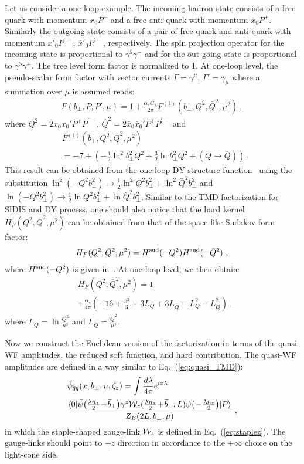 \documentclass[aps,rmp,reprint,amsmath,amssymb,graphicx,longbibliography]{revtex4-1} %
\newcommand{\nn}{\nonumber}
\begin{document}
Let us consider a one-loop example. The incoming hadron state consists of a free quark with momentum $x_0P^+$ and a free anti-quark with momentum $\bar x_0 P^+$. Similarly the outgoing state consists of a pair of free quark and anti-quark with momentum $x'_0P^{'-}$, $\bar x'_0 P^{'-}$, respectively. The spin projection operator for the incoming state is proportional to $\gamma^5 \gamma^-$ and for the out-going state is proportional to $\gamma^5 \gamma^+$. The tree level form factor is normalized to 1. At one-loop level, the pseudo-scalar form factor with vector currents $\Gamma=\gamma^{\mu}$, $\Gamma'=\gamma_{\mu}$ where a summation over $\mu$ is assumed reads:
\begin{align}
	F(b_\perp,P,P',\mu)=1+\frac{\alpha_s C_F}{2\pi}F^{(1)}(b_\perp,Q^2,\bar Q^2,\mu^2)\ ,
\end{align}
where $Q^2=2x_0x_0'P^+P^{'-}$, $\bar Q^2=2\bar x_0\bar x_0'P^+P^{'-}$ and
\begin{align}
	&F^{(1)}(b_\perp,Q^2,\bar Q^2,\mu^2) \\
	&=-7+\left(-\frac{1}{2}\ln^2 b^2_\perp Q^2+\frac{3}{2}\ln b^2_\perp Q^2+\left(Q \rightarrow \bar Q\right)\right) \ . \nn
\end{align}
This result can be obtained from the one-loop DY structure function~\cite{DAlesio:2014mrz} using the substitution $\ln^2(-Q^2b^2_\perp)\rightarrow \frac{1}{2}\ln^2 Q^2b^2_\perp+\ln^2 \bar Q^2b^2_\perp$ and $\ln(-Q^2b^2_\perp)\rightarrow \frac{1}{2}\ln Q^2b^2_\perp+\ln \bar Q^2b^2_\perp$. Similar to the TMD factorization for SIDIS and DY process, one should also notice that the hard kernel $H_F(Q^2,\bar Q^2,\mu^2)$ can be obtained from that of the space-like Sudakov form factor:
\begin{align}
	H_F(Q^2,\bar Q^2,\mu^2)=H^{\rm sud}(-Q^2)H^{\rm sud}(-\bar Q^2) \ ,
\end{align}
where $H^{\rm sud}(-Q^2)$ is given in~\cite{Collins:2017oxh}. At one-loop level, we then obtain:
\begin{align}
	& H_F(Q^2,\bar Q^2,\mu^2)=1\nonumber \\
	&+\frac{\alpha_s}{4\pi}\left(-16+\frac{\pi^2}{3}+3L_Q+3L_{\bar Q}-L_Q^2-L_{\bar Q}^2\right)  \ ,
\end{align}
where $L_Q=\ln \frac{Q^2}{\mu^2}$ and $L_{\bar Q}=\frac{\bar Q^2}{\mu^2}$.

Now we construct the Euclidean version of the factorization in terms of the quasi-WF amplitudes,
the reduced soft function, and hard contribution. The quasi-WF amplitudes are defined in a way similar to Eq.~(\ref{eq:quasi_TMD}):
\begin{align}
	&\tilde \psi_{\bar q q}(x,b_\perp,\mu,\zeta_z)=\int \frac{d\lambda}{4\pi}e^{ix\lambda}\nonumber\\
	&\frac{\langle 0| \bar \psi\big(\frac{\lambda n_z }{2}\!+\!\vec{b}_\perp\big)\gamma^z{\cal W}_{z}(\frac{\lambda n_z}{2}\!+\!\vec{b}_\perp;L)\psi\big(\!-\!\frac{\lambda n_z}{2}\big) |P\rangle}{Z_E(2L,b_\perp,\mu)} \ ,
\end{align}
in which the staple-shaped gauge-link ${\cal W}_z$ is defined in Eq.~(\ref{eq:staplez}). The gauge-links should point to $+z$ direction in accordance to the $+\infty$ choice on the light-cone side.
\end{document}
